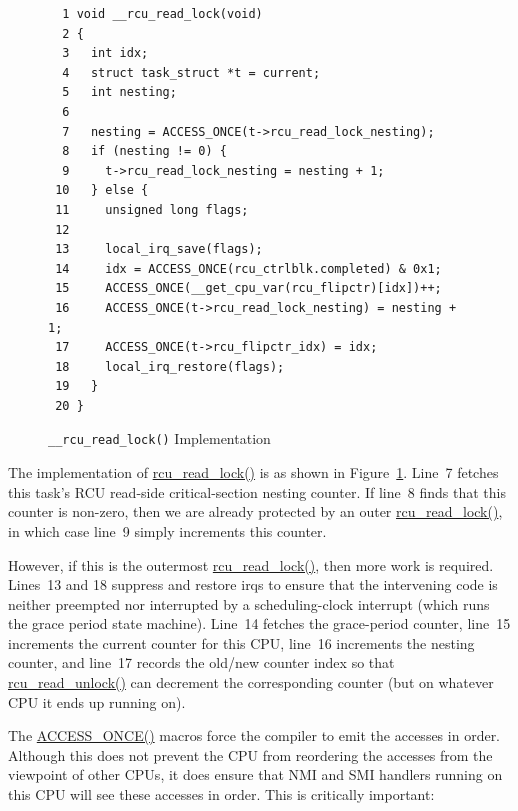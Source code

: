 \begin{figure}[tbp]
{ \scriptsize
\begin{verbatim}
  1 void __rcu_read_lock(void)
  2 {
  3   int idx;
  4   struct task_struct *t = current;
  5   int nesting;
  6
  7   nesting = ACCESS_ONCE(t->rcu_read_lock_nesting);
  8   if (nesting != 0) {
  9     t->rcu_read_lock_nesting = nesting + 1;
 10   } else {
 11     unsigned long flags;
 12
 13     local_irq_save(flags);
 14     idx = ACCESS_ONCE(rcu_ctrlblk.completed) & 0x1;
 15     ACCESS_ONCE(__get_cpu_var(rcu_flipctr)[idx])++;
 16     ACCESS_ONCE(t->rcu_read_lock_nesting) = nesting + 1;
 17     ACCESS_ONCE(t->rcu_flipctr_idx) = idx;
 18     local_irq_restore(flags);
 19   }
 20 }
\end{verbatim}
}
\caption{{\tt \_\_rcu\_read\_lock()} Implementation}
\label{fig:app:rcuimpl:__rcu_read_lock() Implementation}
\end{figure}

The implementation of \url{rcu_read_lock()} is as shown in
Figure~\ref{fig:app:rcuimpl:__rcu_read_lock() Implementation}.
Line~7 fetches this task's RCU read-side critical-section nesting
counter.
If line~8 finds that this counter is non-zero,
then we are already protected by an outer
\url{rcu_read_lock()}, in which case line~9 simply increments
this counter.

However, if this is the outermost \url{rcu_read_lock()},
then more work is required.
Lines~13 and 18 suppress and restore irqs to ensure that the
intervening code is neither preempted nor interrupted by a
scheduling-clock interrupt (which runs the grace period state machine).
Line~14 fetches the grace-period counter,
line~15 increments the current counter for
this CPU, line~16 increments the nesting counter,
and line~17 records the old/new counter index so that
\url{rcu_read_unlock()} can decrement the corresponding
counter (but on whatever CPU it ends up running on).

The \url{ACCESS_ONCE()} macros force the compiler to
emit the accesses in order.
Although this does not prevent the CPU from reordering the accesses
from the viewpoint of other CPUs, it does ensure that NMI and
SMI handlers running on this CPU will see these accesses in order.
This is critically important:

